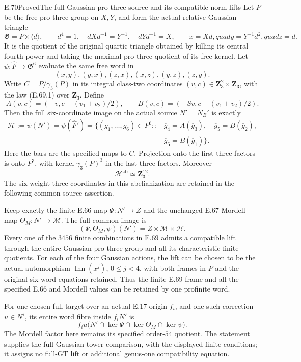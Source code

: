 \begin{statement}{E.70}{Proved}{The full Gaussian pro-three source and its compatible norm lifts}
Let $P$ be the free pro-three group on $X,Y$, and form the
actual relative Gaussian triangle
\[
 \mathfrak G=P\rtimes\langle d\rangle,\qquad
 d^4=1,\quad dXd^{-1}=Y^{-1},\quad dYd^{-1}=X,
 \qquad x=Xd,quad y=Y^{-1}d^2,quad z=d.
 \tag{E.70.1}
\]
It is the quotient of the original quartic triangle
obtained by killing its central fourth power and taking
the maximal pro-three quotient of its free kernel.
Let $\psi:\widehat F\to\mathfrak G^6$ evaluate the same
free word in
\[
                (x,y),(y,x),(z,x),(x,z),(y,z),(z,y).
 \tag{E.70.2}
\]
Write $C=P/\gamma_3(P)$ in its integral class-two
coordinates $(v,c)\in\mathbf Z_3^2\times\mathbf Z_3$,
with the law (E.69.1) over $\mathbf Z_3$. Define
\[
 A(v,c)=(-v,c-(v_1+v_2)/2),\qquad
 B(v,c)=(-Sv,c-(v_1+v_2)/2).
 \tag{E.70.3}
\]
Then the full six-coordinate image on the actual source
$N'=N_B'$ is exactly
\[
 \begin{split}
 \mathscr H:=\psi(N')=\psi(\widehat F')
 =\{(g_1,\ldots,g_6)\in P^6:;&
 \overline g_4=A(\overline g_3),\quad
 \overline g_5=B(\overline g_2),\\[-2pt]
 &\overline g_6=B(\overline g_1)\}.
 \end{split}
 \tag{E.70.4}
\]
Here the bars are the specified maps to $C$. Projection
onto the first three factors is onto $P^3$, with kernel
$\gamma_3(P)^3$ in the last three factors. Moreover
\[
             \mathscr H^{\mathrm{ab}}\simeq\mathbf Z_3^{12}.
 \tag{E.70.5}
\]
The six weight-three coordinates in this abelianization
are retained in the following common-source assertion.

Keep exactly the finite E.66 map $\Psi:N'\to Z$ and
the unchanged E.67 Mordell map $\Theta_M:N'\to\mathcal M$.
The full common image is
\[
       (\Psi,\Theta_M,\psi)(N')
            =Z\times\mathcal M\times\mathscr H.
 \tag{E.70.6}
\]
Every one of the $3456$ finite combinations in E.69
admits a compatible lift through the entire Gaussian
pro-three group and all its characteristic finite
quotients. For each of the four Gaussian actions, the
lift can be chosen to be the actual automorphism
$\operatorname{Inn}(x^j)$, $0\leq j<4$, with both
frames in $P$ and the original six word equations
retained. Thus the finite E.69 frame and all the
specified E.66 and Mordell values can be retained by
one profinite word.

For one chosen full target over an actual E.17 origin
$f_i$, and one such correction $u\in N'$, its entire
word fibre inside $f_iN'$ is
\[
 f_i u\bigl(N'\cap\ker\Psi\cap\ker\Theta_M\cap\ker\psi\bigr).
 \tag{E.70.7}
\]
The Mordell factor here remains its specified order-$54$
quotient. The statement supplies the full Gaussian
tower comparison, with the displayed finite conditions;
it assigns no full-GT lift or additional genus-one
compatibility equation.
\end{statement}
